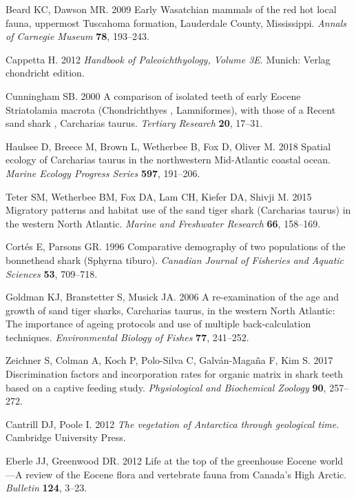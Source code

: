\documentclass[]{rsos}%
\begin{document}
\begin{thebibliography}{99}
Beard KC, Dawson MR. 2009  Early Wasatchian mammals of the red hot local fauna,
  uppermost Tuscahoma formation, Lauderdale County, Mississippi. {\em Annals of
  Carnegie Museum} \textbf{78}, 193--243.

Cappetta H. 2012 {\em {Handbook of Paleoichthyology, Volume 3E}}.
Munich: Verlag chondricht edition.

Cunningham SB. 2000  {A comparison of isolated teeth of early Eocene
  Striatolamia macrota (Chondrichthyes , Lamniformes), with those of a Recent
  sand shark , Carcharias taurus}. {\em Tertiary Research} \textbf{20}, 17--31.

Haulsee D, Breece M, Brown L, Wetherbee B, Fox D, Oliver M. 2018  Spatial
  ecology of Carcharias taurus in the northwestern Mid-Atlantic coastal ocean.
  {\em Marine Ecology Progress Series} \textbf{597}, 191--206.

Teter SM, Wetherbee BM, Fox DA, Lam CH, Kiefer DA, Shivji M. 2015  {Migratory
  patterns and habitat use of the sand tiger shark (Carcharias taurus) in the
  western North Atlantic}. {\em Marine and Freshwater Research} \textbf{66},
  158--169.

Cort{\'e}s E, Parsons GR. 1996  Comparative demography of two populations of
  the bonnethead shark (Sphyrna tiburo). {\em Canadian Journal of Fisheries and
  Aquatic Sciences} \textbf{53}, 709--718.

Goldman KJ, Branstetter S, Musick JA. 2006  {A re-examination of the age and
  growth of sand tiger sharks, Carcharias taurus, in the western North
  Atlantic: The importance of ageing protocols and use of multiple
  back-calculation techniques}. {\em Environmental Biology of Fishes}
  \textbf{77}, 241--252.

Zeichner S, Colman A, Koch P, Polo-Silva C, Galv{\'a}n-Maga{\~n}a F, Kim S.
  2017  Discrimination factors and incorporation rates for organic matrix in
  shark teeth based on a captive feeding study. {\em Physiological and
  Biochemical Zoology} \textbf{90}, 257--272.

Cantrill DJ, Poole I. 2012 {\em The vegetation of Antarctica through geological
  time}.
Cambridge University Press.

Eberle JJ, Greenwood DR. 2012  Life at the top of the greenhouse Eocene
  world—A review of the Eocene flora and vertebrate fauna from Canada’s
  High Arctic. {\em Bulletin} \textbf{124}, 3--23.


\end{thebibliography}
\end{document}
